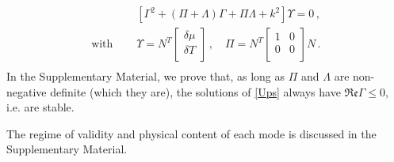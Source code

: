 \documentclass[a4paper, amsfonts, amssymb, amsmath, reprint, showkeys, nofootinbib, twoside,notitlepage]{revtex4-1}
\theoremstyle{definition}
\theoremstyle{theorem}
\begin{document}
\begin{equation}\label{Ups}
\begin{split}
&[\Gamma^2+(\Pi{+}\Lambda) \Gamma +\Pi \Lambda+k^2]\Upsilon =0\, ,\\
\text{with }\quad &\Upsilon= N^T \begin{bmatrix}\!
\delta \mu \\
\delta T \\
\end{bmatrix}\, , \quad \Pi= N^T\begin{bmatrix}
1 & 0 \\
0 & 0 \\
\end{bmatrix}
N \, .\\
\end{split}
\end{equation}
In the Supplementary Material, we prove that, as long as $\Pi$ and $\Lambda$ are non-negative definite (which they are), the solutions of \eqref{Ups} always have $\mathfrak{Re}\Gamma\leq 0$, i.e. are stable. 

The regime of validity and physical content of each mode is discussed in the Supplementary Material.
\end{document}
